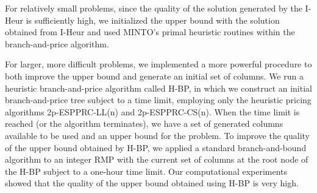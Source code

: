 For relatively small problems, since the quality of the solution 
generated by the I-Heur is sufficiently high, we initialized the upper bound with the 
solution obtained from I-Heur and used MINTO's primal heuristic routines within the 
branch-and-price algorithm.
 
For larger, more difficult problems, we implemented a more powerful procedure to 
both improve the upper bound and generate an initial set of columns. 
We run a heuristic branch-and-price algorithm called H-BP, in which we construct
an initial branch-and-price tree subject to a time limit, employing only the
 heuristic pricing algorithms 2p-ESPPRC-LL(n) and 2p-ESPPRC-CS(n).  
When the time limit is reached (or the algorithm terminates), we have a set of 
generated columns available to be used and an upper bound for the problem.  
To improve the quality of the upper bound obtained by H-BP, we applied
a standard branch-and-bound algorithm to an integer RMP with the current
set of columns at the root node of the H-BP subject to a one-hour 
time limit. Our computational experiments showed that the quality of the 
upper bound obtained using H-BP is very high. 



